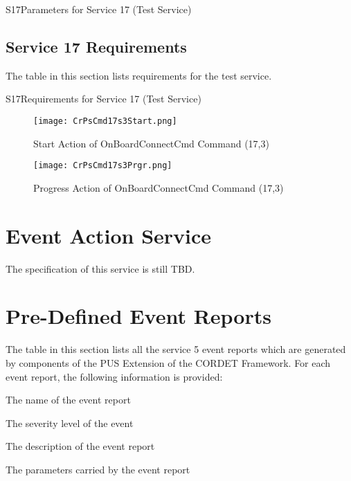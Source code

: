 \documentclass{pnp_article}
\begin{document}
\begin{cr_par}{S17}{Parameters for Service 17 (Test Service)}
\end{cr_par}


\subsection{Service 17 Requirements}
The table in this section lists requirements for the test service.

\begin{cr_req}{S17}{Requirements for Service 17 (Test Service)}
\end{cr_req}

\newpage
\begin{figure}[H]
 \centering
 \texttt{[image: CrPsCmd17s3Start.png]}
 \caption{Start Action of OnBoardConnectCmd Command (17,3)}
 \label{fig:Cmd17s3Start}
\end{figure}

\begin{figure}[H]
 \centering
 \texttt{[image: CrPsCmd17s3Prgr.png]}
 \caption{Progress Action of OnBoardConnectCmd Command (17,3)}
 \label{fig:Cmd17s3Prgr}
\end{figure}


\section{Event Action Service}\label{sec:serv19}
The specification of this service is still TBD.



\newpage
\appendix
\section{Pre-Defined Event Reports}\label{sec:preDefEvtRep}
The table in this section lists all the service 5 event reports which are generated by components of the PUS Extension of the CORDET Framework. For each event report, the following information is provided:

\begin{fw_itemize}
\item The name of the event report
\item The severity level of the event 
\item The description of the event report
\item The parameters carried by the event report
\end{fw_itemize}
\end{document}
